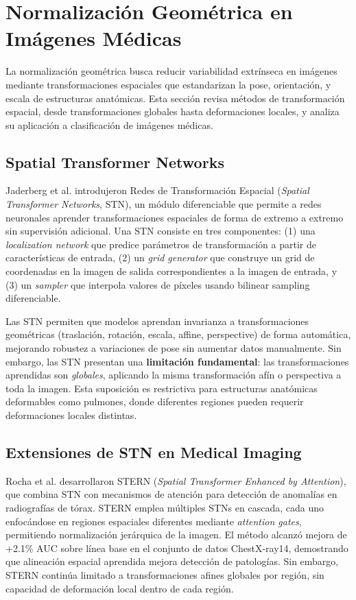 \section{Normalización Geométrica en Imágenes Médicas}
\label{sec:normalizacion_geometrica_estado_arte}

La normalización geométrica busca reducir variabilidad extrínseca en imágenes mediante transformaciones espaciales que estandarizan la pose, orientación, y escala de estructuras anatómicas. Esta sección revisa métodos de transformación espacial, desde transformaciones globales hasta deformaciones locales, y analiza su aplicación a clasificación de imágenes médicas.

\subsection{Spatial Transformer Networks}

Jaderberg et al. \cite{jaderberg2015spatial} introdujeron Redes de Transformación Espacial (\textit{Spatial Transformer Networks}, STN), un módulo diferenciable que permite a redes neuronales aprender transformaciones espaciales de forma de extremo a extremo sin supervisión adicional. Una STN consiste en tres componentes: (1) una \textit{localization network} que predice parámetros de transformación a partir de características de entrada, (2) un \textit{grid generator} que construye un grid de coordenadas en la imagen de salida correspondientes a la imagen de entrada, y (3) un \textit{sampler} que interpola valores de píxeles usando bilinear sampling diferenciable.

Las STN permiten que modelos aprendan invarianza a transformaciones geométricas (traslación, rotación, escala, affine, perspective) de forma automática, mejorando robustez a variaciones de pose sin aumentar datos manualmente. Sin embargo, las STN presentan una \textbf{limitación fundamental}: las transformaciones aprendidas son \textit{globales}, aplicando la misma transformación afín o perspectiva a toda la imagen. Esta suposición es restrictiva para estructuras anatómicas deformables como pulmones, donde diferentes regiones pueden requerir deformaciones locales distintas.

\subsection{Extensiones de STN en Medical Imaging}

Rocha et al. \cite{rocha2024stern} desarrollaron STERN (\textit{Spatial Transformer Enhanced by Attention}), que combina STN con mecanismos de atención para detección de anomalías en radiografías de tórax. STERN emplea múltiples STNs en cascada, cada uno enfocándose en regiones espaciales diferentes mediante \textit{attention gates}, permitiendo normalización jerárquica de la imagen. El método alcanzó mejora de +2.1\% AUC sobre línea base en el conjunto de datos ChestX-ray14, demostrando que alineación espacial aprendida mejora detección de patologías. Sin embargo, STERN continúa limitado a transformaciones afines globales por región, sin capacidad de deformación local dentro de cada región.

